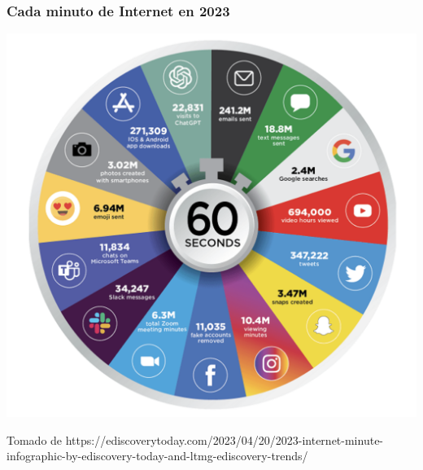 \documentclass[
	10pt, %
	aspectratio=169, %
]{beamer}
\begin{document}
\begin{frame}
	
	\frametitle{Cada minuto de Internet en 2023}
	
	\centering
	\includegraphics[scale=0.36]{info-2023.png} 
	
	{\scriptsize Tomado de https://ediscoverytoday.com/2023/04/20/2023-internet-minute-infographic-by-ediscovery-today-and-ltmg-ediscovery-trends/}
	
\end{frame}

\end{document}
